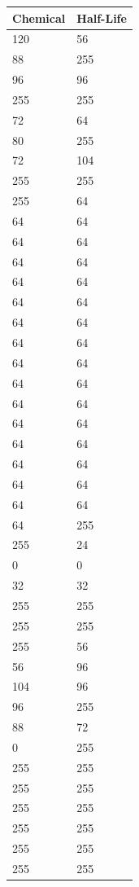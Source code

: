 \documentclass{article}
\begin{document}
\begin{longtable}{|p{4cm}|p{4cm}|}
\hline
{\bf Chemical} & {\bf Half-Life} \\ \hline
120 & 56 \\ \hline
88 & 255 \\ \hline
96 & 96 \\ \hline
255 & 255 \\ \hline
72 & 64 \\ \hline
80 & 255 \\ \hline
72 & 104 \\ \hline
255 & 255 \\ \hline
255 & 64 \\ \hline
64 & 64 \\ \hline
64 & 64 \\ \hline
64 & 64 \\ \hline
64 & 64 \\ \hline
64 & 64 \\ \hline
64 & 64 \\ \hline
64 & 64 \\ \hline
64 & 64 \\ \hline
64 & 64 \\ \hline
64 & 64 \\ \hline
64 & 64 \\ \hline
64 & 64 \\ \hline
64 & 64 \\ \hline
64 & 64 \\ \hline
64 & 64 \\ \hline
64 & 255 \\ \hline
255 & 24 \\ \hline
0 & 0 \\ \hline
32 & 32 \\ \hline
255 & 255 \\ \hline
255 & 255 \\ \hline
255 & 56 \\ \hline
56 & 96 \\ \hline
104 & 96 \\ \hline
96 & 255 \\ \hline
88 & 72 \\ \hline
0 & 255 \\ \hline
255 & 255 \\ \hline
255 & 255 \\ \hline
255 & 255 \\ \hline
255 & 255 \\ \hline
255 & 255 \\ \hline
255 & 255 \\ \hline

\end{longtable}
\end{document}
